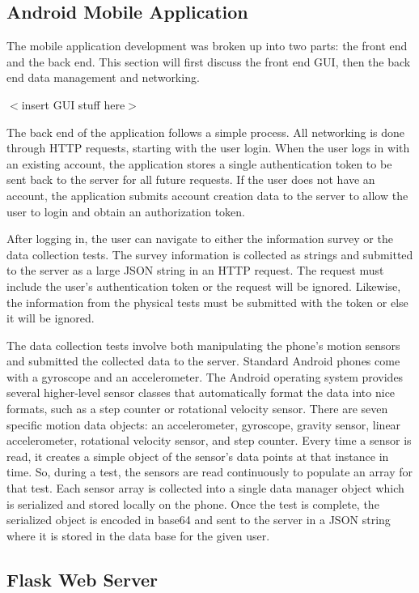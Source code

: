 \documentclass[conference]{IEEEtran}
\begin{document}
\subsection{Android Mobile Application}
The mobile application development was broken up into two parts: the front end and the back end. This section will first discuss the front end GUI, then the back end data management and networking.

$<$insert GUI stuff here$>$

The back end of the application follows a simple process. All networking is done through HTTP requests, starting with the user login. When the user logs in with an existing account, the application stores a single authentication token to be sent back to the server for all future requests. If the user does not have an account, the application submits account creation data to the server to allow the user to login and obtain an authorization token. 

After logging in, the user can navigate to either the information survey or the data collection tests. The survey information is collected as strings and submitted to the server as a large JSON string in an HTTP request. The request must include the user's authentication token or the request will be ignored. Likewise, the information from the physical tests must be submitted with the token or else it will be ignored.

The data collection tests involve both manipulating the phone's motion sensors and submitted the collected data to the server. Standard Android phones come with a gyroscope and an accelerometer. The Android operating system provides several higher-level sensor classes that automatically format the data into nice formats, such as a step counter or rotational velocity sensor. There are seven specific motion data objects: an accelerometer, gyroscope, gravity sensor, linear accelerometer, rotational velocity sensor, and step counter. Every time a sensor is read, it creates a simple object of the sensor's data points at that instance in time. So, during a test, the sensors are read continuously to populate an array for that test. Each sensor array is collected into a single data manager object which is serialized and stored locally on the phone. Once the test is complete, the serialized object is encoded in base64 and sent to the server in a JSON string where it is stored in the data base for the given user. 


\subsection{Flask Web Server}
\end{document}
